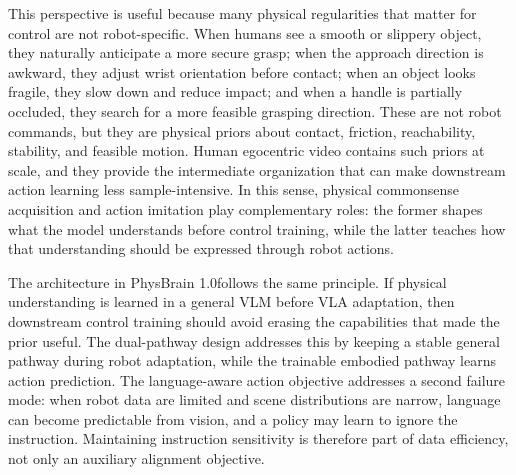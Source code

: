 \documentclass{llmxive}
\begin{document}
This perspective is useful because many physical regularities that matter for control are not robot-specific. When humans see a smooth or slippery object, they naturally anticipate a more secure grasp; when the approach direction is awkward, they adjust wrist orientation before contact; when an object looks fragile, they slow down and reduce impact; and when a handle is partially occluded, they search for a more feasible grasping direction. These are not robot commands, but they are physical priors about contact, friction, reachability, stability, and feasible motion. Human egocentric video contains such priors at scale, and they provide the intermediate organization that can make downstream action learning less sample-intensive. In this sense, physical commonsense acquisition and action imitation play complementary roles: the former shapes what the model understands before control training, while the latter teaches how that understanding should be expressed through robot actions.

The architecture in PhysBrain 1.0follows the same principle. If physical understanding is learned in a general VLM before VLA adaptation, then downstream control training should avoid erasing the capabilities that made the prior useful. The dual-pathway design addresses this by keeping a stable general pathway during robot adaptation, while the trainable embodied pathway learns action prediction. The language-aware action objective addresses a second failure mode: when robot data are limited and scene distributions are narrow, language can become predictable from vision, and a policy may learn to ignore the instruction. Maintaining instruction sensitivity is therefore part of data efficiency, not only an auxiliary alignment objective.

\end{document}
